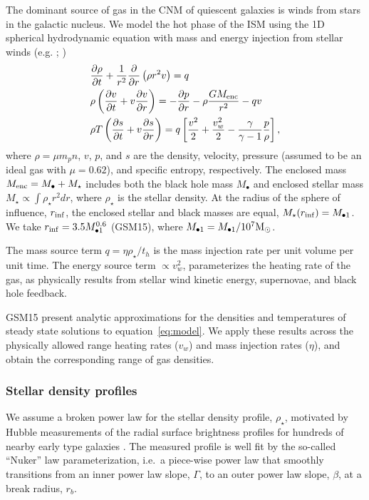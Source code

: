 \documentclass[usenatbib,fleqn]{mnras}
\newcommand{\Mbh}[1][]{M_{\bullet1}}
\newcommand{\Menc}{M_{\rm enc}}
\renewcommand{\th}{t_h}
\newcommand{\Msun}{{\rm M_\odot}}
\begin{document}
The dominant source of gas in the CNM of quiescent galaxies is winds
from stars in the galactic nucleus. We model the hot phase of the ISM
using the 1D spherical hydrodynamic equation with mass and energy
injection from stellar winds (e.g. \citealt{Holzer+1970};
\citealt{Quataert2004})
\begin{align}
  &\frac{\partial \rho}{\partial t}+\frac{1}{r^2}\frac{\partial}{\partial r}\left(\rho r^2 v\right)=q \label{eq:drhodt}\\
  &\rho \left(\frac{\partial v}{\partial t} + v\frac{\partial
      v}{\partial r}\right) =-\frac{\partial p}{\partial r}- \rho\frac{GM_{\rm enc}}{r^{2}} -q v \label{eq:dvdt}\\
  &\rho T\left(\frac{\partial s}{\partial t} + v\frac{\partial
      s}{\partial
      r}\right)=q\left[\frac{v^2}{2}+\frac{v_w^2}{2}-\frac{\gamma}{\gamma-1}
    \frac{p}{\rho} \right] ,
\label{eq:model}
\end{align}
where $\rho = \mu m_p n$, $v$, $p$, and $s$ are the density, velocity,
pressure (assumed to be an ideal gas with $\mu = 0.62$), and specific
entropy, respectively.  The enclosed mass $\Menc = M_{\bullet} +
M_{\star}$ includes both the black hole mass $M_{\bullet}$ and
enclosed stellar mass $M_{\star} \propto \int \rho_{\star}r^{2}dr$,
where $\rho_{\star}$ is the stellar density. At the radius of the
sphere of influence, $r_{\rm inf}$, the enclosed stellar and black
masses are equal, $M_{\star}(r_{\rm inf})=\Mbh$.  We take $r_{\rm
  inf}=3.5 \Mbh[,7]^{0.6}$ (GSM15), where $\Mbh[,7]=\Mbh/10^7 \Msun$.

The mass source term $q =\eta \rho_\star/\th$ is the mass injection
rate per unit volume per unit time. The energy source term $\propto
v_w^{2}$, parameterizes the heating rate of the gas, as physically
results from stellar wind kinetic energy, supernovae, and black hole
feedback.

GSM15 present analytic approximations for the
densities and temperatures of steady state solutions to
equation~\eqref{eq:model}. We apply these results across the
physically allowed range heating rates ($v_w$) and mass injection
rates ($\eta$), and obtain the corresponding range of gas densities.

\subsubsection{Stellar density profiles}
We assume a broken power law for the stellar density profile,
$\rho_{\star}$, motivated by Hubble measurements of the radial surface
brightness profiles for hundreds of nearby early type galaxies
\citep{Lauer+2007}.  The measured profile is well fit by the so-called
``Nuker'' law parameterization, i.e.~a piece-wise power law that smoothly
transitions from an inner power law slope, $\Gamma$, to an outer power
law slope, $\beta$, at a break radius, $r_b$.
\end{document}
